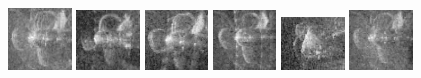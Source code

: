 \begin{figure}
    \includegraphics[width=0.15\textwidth]{chapters/images/dataset/all-class-images/propeler/propeler-30.jpg}
    \includegraphics[width=0.15\textwidth]{chapters/images/dataset/all-class-images/propeler/propeler-74.jpg}
    \includegraphics[width=0.15\textwidth]{chapters/images/dataset/all-class-images/propeler/propeler-46.jpg}
    \includegraphics[width=0.15\textwidth]{chapters/images/dataset/all-class-images/propeler/propeler-107.jpg}
    \includegraphics[width=0.15\textwidth]{chapters/images/dataset/all-class-images/propeler/propeler-120.jpg}
    \includegraphics[width=0.15\textwidth]{chapters/images/dataset/all-class-images/propeler/propeler-94.jpg}
    

\end{figure}
